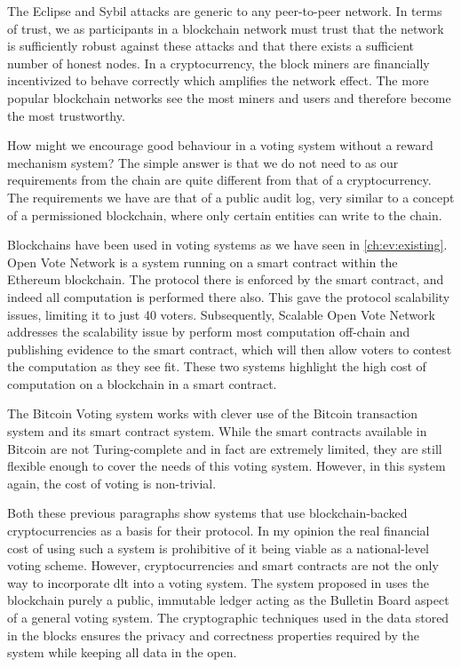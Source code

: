 The Eclipse and Sybil attacks are generic to any peer-to-peer network. In terms of trust, we as participants in a blockchain network must trust that the network is sufficiently robust against these attacks and that there exists a sufficient number of honest nodes. In a cryptocurrency, the block miners are financially incentivized to behave correctly which amplifies the network effect. The more popular blockchain networks see the most miners and users and therefore become the most trustworthy.

How might we encourage good behaviour in a voting system without a reward mechanism system? The simple answer is that we do not need to as our requirements from the chain are quite different from that of a cryptocurrency. The requirements we have are that of a public audit log, very similar to a concept of a permissioned blockchain, where only certain entities can write to the chain.

Blockchains have been used in voting systems as we have seen in \autoref{ch:ev:existing}. Open Vote Network \cite{mccorrySmartContractBoardroom2017} is a system running on a smart contract within the Ethereum blockchain. The protocol there is enforced by the smart contract, and indeed all computation is performed there also. This gave the protocol scalability issues, limiting it to just 40 voters. Subsequently, Scalable Open Vote Network \cite{seifelnasrScalableOpenVoteNetwork2020} addresses the scalability issue by perform most computation off-chain and publishing evidence to the smart contract, which will then allow voters to contest the computation as they see fit. These two systems highlight the high cost of computation on a blockchain in a smart contract.

The Bitcoin Voting \cite{zhaoHowVotePrivately2016} system works with clever use of the Bitcoin transaction system and its smart contract system. While the smart contracts available in Bitcoin are not Turing-complete and in fact are extremely limited, they are still flexible enough to cover the needs of this voting system. However, in this system again, the cost of voting is non-trivial.

Both these previous paragraphs show systems that use blockchain-backed cryptocurrencies as a basis for their protocol. In my opinion the real financial cost of using such a system is prohibitive of it being viable as a national-level voting scheme. However, cryptocurrencies and smart contracts are not the only way to incorporate \gls{dlt} into a voting system. The system proposed in \cite{yangBlockchainVotingPublicly2020} uses the blockchain purely a public, immutable ledger acting as the Bulletin Board aspect of a general voting system. The cryptographic techniques used in the data stored in the blocks ensures the privacy and correctness properties required by the system while keeping all data in the open.

